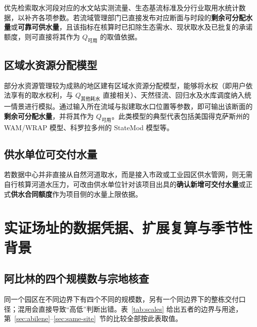 优先检索取水河段对应的水文站实测流量、生态基流标准及分行业取用水统计数据，以补齐各项参数。若流域管理部门已直接发布对应断面与时段的\textbf{剩余可分配水量}或\textbf{可靠可供水量}，且该指标在核算时已扣除生态需水、现状取水及已批复的承诺额度，则可直接将其作为 $Q_{\text{可用}}$ 的取值依据。\cite{q1bref02,q1bref03,q1bref08,q1bref09}

\subsection{区域水资源分配模型}\label{apx:e2}

部分水资源管理较为成熟的地区建有区域水资源分配模型，能够将水权（即用户依法享有的取水权利，与 $Q_{\text{其他耗水}}$ 直接相关）、天然径流、回归水及水库调度纳入统一情景进行模拟。通过输入所在流域与拟建取水口位置等参数，即可输出该断面的\textbf{剩余可分配水量}，并将其作为 $Q_{\text{可用}}$。此类模型的典型代表包括美国得克萨斯州的 WAM/WRAP 模型、科罗拉多州的 StateMod 模型等。\cite{q1bref06,q1bref10}

\subsection{供水单位可交付水量}\label{apx:e3}

若数据中心并非直接从自然河道取水，而是接入市政或工业园区供水管网，则无需自行核算河道水压力，可改由供水单位针对该项目出具的\textbf{确认新增可交付水量}或正式\textbf{供水合同额度}作为项目侧的水量上限依据。

\section{实证场址的数据凭据、扩展复算与季节性背景}\label{apx:f}

\subsection{阿比林的四个规模数与宗地核查}\label{apx:f1}

同一个园区在不同边界下有四个不同的规模数，另有一个同边界下的整栋交付口径；混用会直接导致“高低”判断出错。表~\ref{tab:scales} 给出五者的边界与用途，第~\ref{sec:abilene}--\ref{sec:same-site}~节的比较全部按此表取值。

